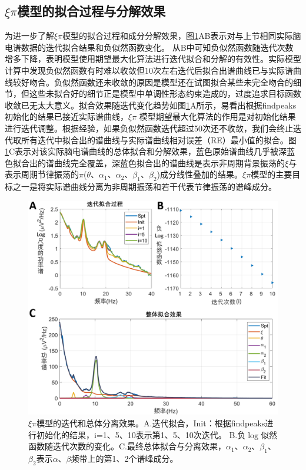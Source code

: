 \subsection{\texorpdfstring{$\xi\pi$}{ξπ}模型的拟合过程与分解效果}
为进一步了解$\xi\pi$模型的拟合过程和成分分解效果，图\ref{7:allinone}AB表示对与上节相同实际脑电谱数据的迭代拟合结果和负似然函数变化。 从B中可知负似然函数随迭代次数增多下降，表明模型使用期望最大化算法进行迭代拟合和分解的有效性。实际模型计算中发现负似然函数有时难以收敛但10次左右迭代后拟合出谱曲线已与实际谱曲线较好吻合。负似然函数还未收敛的原因是模型还在试图拟合某些未完全吻合的细节，但这些未拟合好的细节正是模型中单调性形态约束造成的，过度追求目标函数收敛已无太大意义。拟合效果随迭代变化趋势如图\ref{7:allinone}A所示，易看出根据findpeaks初始化的结果已接近实际谱曲线，$\xi\pi$
模型期望最大化算法的作用是对初始化结果进行迭代调整。根据经验，如果负似然函数迭代超过50次还不收敛，我们会终止迭代取所有迭代中拟合出的谱曲线与实际谱曲线相对误差（RE）最小值的拟合。图\ref{7:allinone}C表示对该实际脑电谱曲线的总体拟合和分解效果，蓝色原始谱曲线几乎被深蓝色拟合出的谱曲线完全覆盖，深蓝色拟合出的谱曲线是表示非周期背景振荡的$\xi$与表示周期节律振荡的$\pi$($\theta$、$\alpha_1$、$\alpha_2$、$\beta_1$、$\beta_2$)成分线性叠加的结果。$\xi\pi$模型的主要目标之一是将实际谱曲线分离为非周期振荡和若干代表节律振荡的谱峰成分。
\bigskip
\bigskip
\bigskip
\begin{figure}[!h]
	\includegraphics[width=15cm]{pic/xipi/allinone.png}
	\caption{$\xi\pi$模型的迭代和总体分离效果。A.迭代拟合，Init：根据findpeaks进行初始化的结果，i=1、5、10表示第1、5、10次迭代。 
	B.负$\log$似然函数随迭代次数的变化。C.最终总体拟合与分离效果，$\alpha_1$、$\alpha_2$、$\beta_1$、$\beta_2$表示$\alpha$、$\beta$频带上的第1、2个谱峰成分。}
	\label{7:allinone}
\end{figure}
\bigskip
\bigskip
\bigskip

